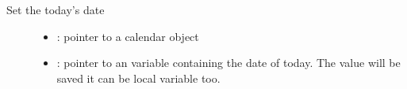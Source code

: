 \documentclass[letterpaper,10pt,english]{sphinxmanual}
\begin{document}
\begin{fulllineitems}
\label{\detokenize{object-types/calendar:_CPPv426lv_calendar_set_today_dateP8lv_obj_tP18lv_calendar_date_t}}%
\pysigstartmultiline
{}\label{\detokenize{object-types/calendar:lv__calendar_8h_1ae898cf7e19a9ced5b34f5e862b07034e}}%
\pysigstopmultiline
Set the today’s date \begin{description}
\item[{}] \leavevmode\begin{itemize}
\item {} 
: pointer to a calendar object 

\item {} 
: pointer to an  variable containing the date of today. The value will be saved it can be local variable too. 

\end{itemize}

\end{description}


\end{fulllineitems}

\end{document}

